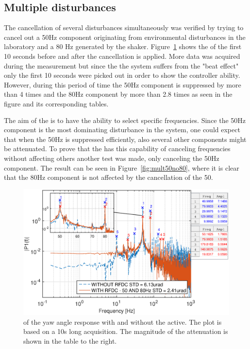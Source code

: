 \subsection{Multiple disturbances}
The cancellation of several disturbances simultaneously was verified by trying to cancel out a 50Hz component originating from environmental disturbances in the laboratory and a 80 Hz generated by the shaker. Figure~\ref{fig:mult5080} shows the \abbrFFT of the first 10 seconds before and after the cancellation is applied. More data was acquired during the measurement but since the the system suffers from the "beat effect" only the first 10 seconds were picked out in order to show the controller ability. However, during this period of time the 50Hz component is suppressed by more than 4 times and the 80Hz component by more than 2.8 times as seen in the figure and its corresponding tables.

The aim of the \abbrRFDC is to have the ability to select specific frequencies. Since the 50Hz component is the most dominating disturbance in the system, one could expect that when the 50Hz is suppressed efficiently, also several other components might be attenuated. To prove that the \abbrRFDC has this capability of canceling frequencies without affecting others another test was made, only canceling the 50Hz component. The result can be seen in Figure~\ref{fig:mult50no80}, where it is clear that the 80Hz component is not affected by the cancellation of the 50.

\begin{figure}[h]
  \centering %
  \includegraphics[width=1\textwidth]{fig/matlab/mult_50_80_closed_loop}
  \caption{\label{fig:mult5080}\abbrFFT of the yaw angle response with and without the \abbrRFDC active. The plot is based on a 10s long acquisition. The magnitude of the attenuation is shown in the table to the right.}
\end{figure}

